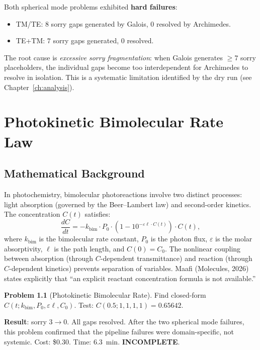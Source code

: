 \documentclass[12pt,a4paper]{report}
\theoremstyle{plain}
\theoremstyle{definition}
\newtheorem{problem}[theorem]{Problem}
\theoremstyle{remark}
\newcommand{\verdict}[1]{\textbf{\textcolor{inkblue}{#1}}}
\begin{document}
Both spherical mode problems exhibited \textbf{hard failures}:
\begin{itemize}
  \item TM/TE: $8$ sorry gaps generated by Galois, $0$ resolved by Archimedes.
  \item TE+TM: $7$ sorry gaps generated, $0$ resolved.
\end{itemize}

\noindent The root cause is \emph{excessive sorry fragmentation}: when Galois generates
$\geq 7$ sorry placeholders, the individual gaps become too interdependent for
Archimedes to resolve in isolation. This is a systematic limitation identified by
the dry run (see Chapter~\ref{ch:analysis}).

\chapter{Photokinetic Bimolecular Rate Law}
\label{ch:photo}

\section{Mathematical Background}

In photochemistry, bimolecular photoreactions involve two distinct processes:
light absorption (governed by the Beer--Lambert law) and second-order kinetics.
The concentration $C(t)$ satisfies:
\[
  \frac{dC}{dt} = -k_{\text{bim}} \cdot P_0 \cdot
  \left(1 - 10^{-\varepsilon \ell \cdot C(t)}\right) \cdot C(t),
\]
where $k_{\text{bim}}$ is the bimolecular rate constant, $P_0$ is the photon flux,
$\varepsilon$ is the molar absorptivity, $\ell$ is the path length, and $C(0) = C_0$.
The nonlinear coupling between absorption (through $C$-dependent transmittance) and
reaction (through $C$-dependent kinetics) prevents separation of variables. Maafi
(Molecules, 2026) states explicitly that ``an explicit reactant concentration formula
is not available.''

\begin{problem}[Photokinetic Bimolecular Rate]
Find closed-form $C(t; k_{\text{bim}}, P_0, \varepsilon\ell, C_0)$.
Test: $C(0.5; 1, 1, 1, 1) = 0.65642$.
\end{problem}

\noindent\textbf{Result}: sorry $3 \to 0$. All gaps resolved. After the two spherical
mode failures, this problem confirmed that the pipeline failures were domain-specific,
not systemic. Cost: \$0.30. Time: 6.3~min. \verdict{INCOMPLETE}.
\end{document}
